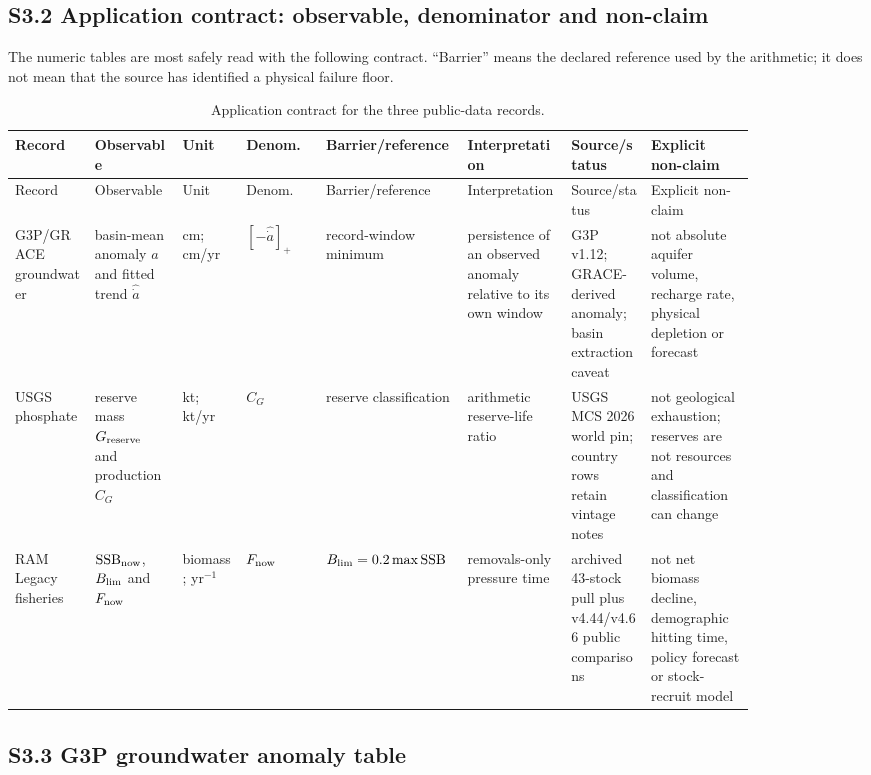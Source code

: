 \documentclass[11pt]{article}
\begin{document}
\subsection*{S3.2 Application contract: observable, denominator and non-claim}

The numeric tables are most safely read with the following contract. ``Barrier'' means the declared reference used by the arithmetic; it does not mean that the source has identified a physical failure floor.

\scriptsize
\begin{longtable}{@{}P{0.10\linewidth}P{0.11\linewidth}P{0.085\linewidth}P{0.10\linewidth}P{0.11\linewidth}P{0.13\linewidth}P{0.10\linewidth}P{0.13\linewidth}@{}}
\caption{Application contract for the three public-data records.}\label{tab:application-contract}\\
\toprule
Record & Observable & Unit & Denom. & Barrier/\allowbreak{}reference & Interpretation & Source/\allowbreak{}status & Explicit\allowbreak{} non-claim \\
\midrule
\endfirsthead
\toprule
Record & Observable & Unit & Denom. & Barrier/\allowbreak{}reference & Interpretation & Source/\allowbreak{}status & Explicit\allowbreak{} non-claim \\
\midrule
\endhead
\bottomrule
\endfoot
G3P/\allowbreak{}GRACE groundwater & basin-mean anomaly $a$ and fitted trend $\widehat{\dot a}$ & cm; cm/yr & $[-\widehat{\dot a}]_+$ & record-window minimum & persistence of an observed anomaly relative to its own window & G3P v1.12; GRACE-\allowbreak{}derived anomaly; basin extraction caveat & not absolute aquifer volume, recharge rate, physical depletion or forecast \\
USGS phosphate & reserve mass $G_{\rm reserve}$ and production $C_G$ & kt; kt/yr & $C_G$ & reserve classification & arithmetic reserve-life ratio & USGS MCS 2026 world pin; country rows retain vintage notes & not geological exhaustion; reserves are not resources and classification can change \\
RAM Legacy fisheries & $\mathrm{SSB}_{\rm now}$, $B_{\rm lim}$ and $F_{\rm now}$ & biomass; yr$^{-1}$ & $F_{\rm now}$ & $B_{\rm lim}=0.2\max\mathrm{SSB}$ & removals-only pressure time & archived 43-stock pull plus v4.44/v4.66 public comparisons & not net biomass decline, demographic hitting time, policy forecast or stock-recruit model \\
\end{longtable}
\normalsize

\subsection*{S3.3 G3P groundwater anomaly table}
\end{document}
